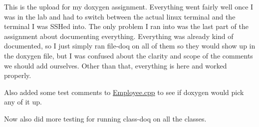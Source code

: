 This is the upload for my doxygen assignment. Everything went fairly well once I was in the lab and had to switch between the actual linux terminal and the terminal I was S\+SH\textquotesingle{}ed into. The only problem I ran into was the last part of the assignment about documenting everything. Everything was already kind of documented, so I just simply ran file-\/doq on all of them so they would show up in the doxygen file, but I was confused about the clarity and scope of the comments we should add ourselves. Other than that, everything is here and worked properly.

Also added some test comments to \mbox{\hyperlink{Employee_8cpp}{Employee.\+cpp}} to see if doxygen would pick any of it up.

Now also did more testing for running class-\/doq on all the classes. 